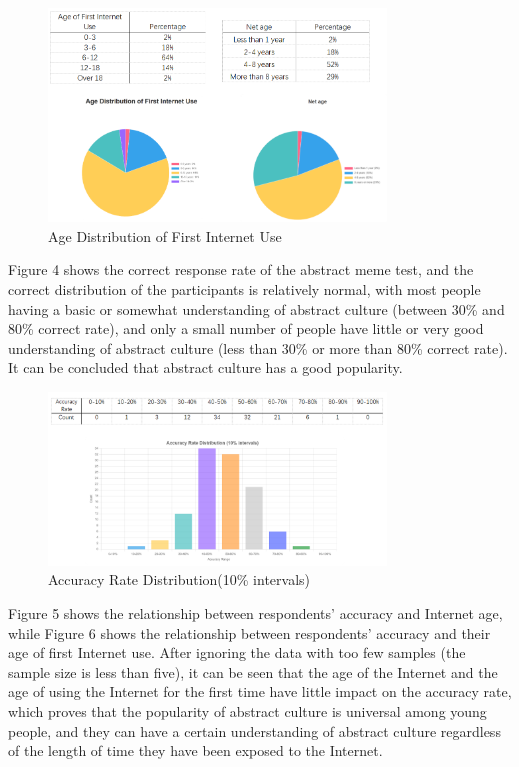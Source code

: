 \documentclass[12pt,a4paper]{ctexart}
\theoremstyle{MyLineTheoremStyle}
\theoremstyle{MyBlockTheoremStyle}
\theoremstyle{MySubsubsectionStyle}
\begin{document}
\begin{figure}[htbp]
    \centering
    \includegraphics[width=0.8\textwidth]{img/first_use_age_distribution.png}
    \caption{Age Distribution of First Internet Use}
    \label{fig:first_use_age_distribution}
\end{figure}
\newpage

Figure 4 shows the correct response rate of the abstract meme test, and the correct distribution of the participants is relatively normal, with most people having a basic or somewhat understanding of abstract culture (between 30\% and 80\% correct rate), and only a small number of people have little or very good understanding of abstract culture (less than 30\% or more than 80\% correct rate). It can be concluded that abstract culture has a good popularity.

\begin{figure}[htbp]
    \centering
    \includegraphics[width=0.8\textwidth]{img/abstract_test_accuracy.png}
    \caption{Accuracy Rate Distribution(10\% intervals)}
    \label{fig:abstract_test_accuracy}
\end{figure}
\newpage

Figure 5 shows the relationship between respondents' accuracy and Internet age, while Figure 6 shows the relationship between respondents' accuracy and their age of first Internet use. After ignoring the data with too few samples (the sample size is less than five), it can be seen that the age of the Internet and the age of using the Internet for the first time have little impact on the accuracy rate, which proves that the popularity of abstract culture is universal among young people, and they can have a certain understanding of abstract culture regardless of the length of time they have been exposed to the Internet.
\end{document}
